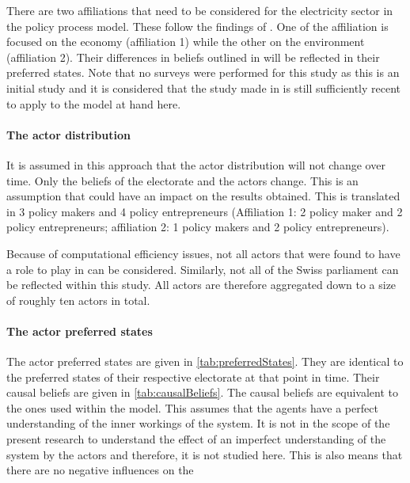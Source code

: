 \documentclass[12pt]{article}
\begin{document}
There are two affiliations that need to be considered for the electricity sector in the policy process model. These follow the findings of \cite{markard2016socio}. One of the affiliation is focused on the economy (affiliation 1) while the other on the environment (affiliation 2). Their differences in beliefs outlined in \cite{markard2016socio} will be reflected in their preferred states. Note that no surveys were performed for this study as this is an initial study and it is considered that the study made in \cite{markard2016socio} is still sufficiently recent to apply to the model at hand here.


\paragraph{The actor distribution}

It is assumed in this approach that the actor distribution will not change over time. Only the beliefs of the electorate and the actors change. This is an assumption that could have an impact on the results obtained. This is translated in 3 policy makers and 4 policy entrepreneurs (Affiliation 1: 2 policy maker and 2 policy entrepreneurs; affiliation 2: 1 policy makers and 2 policy entrepreneurs).

Because of computational efficiency issues, not all actors that were found to have a role to play in \cite{markard2016socio} can be considered. Similarly, not all of the Swiss parliament can be reflected within this study. All actors are therefore aggregated down to a size of roughly ten actors in total. 

\paragraph{The actor preferred states} The actor preferred states are given in \autoref{tab:preferredStates}. They are identical to the preferred states of their respective electorate at that point in time. Their causal beliefs are given in \autoref{tab:causalBeliefs}. The causal beliefs are equivalent to the ones used within the model. This assumes that the agents have a perfect understanding of the inner workings of the system. It is not in the scope of the present research to understand the effect of an imperfect understanding of the system by the actors and therefore, it is not studied here. This is also means that there are no negative influences on the 
\end{document}

